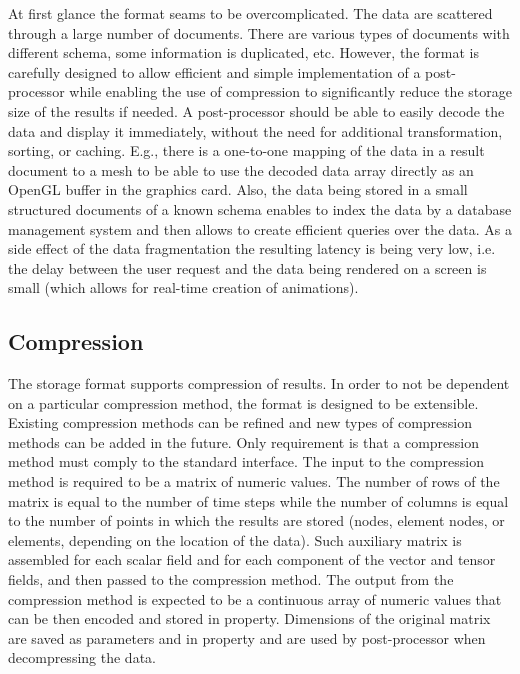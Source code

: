 At first glance the format seams to be overcomplicated. The data are scattered through a large number of documents. There are various types of documents with different schema, some information is duplicated, etc. However, the format is carefully designed to allow efficient and simple implementation of a post-processor while enabling the use of compression to significantly reduce the storage size of the results if needed. A post-processor should be able to easily decode the data and display it immediately, without the need for additional transformation, sorting, or caching. E.g., there is a one-to-one mapping of the data in a result document to a mesh to be able to use the decoded data array directly as an OpenGL buffer in the graphics card. Also, the data being stored in a small structured documents of a known schema enables to index the data by a database management system and then allows to create efficient queries over the data. As a side effect of the data fragmentation the resulting latency is being very low, i.e. the delay between the user request and the data being rendered on a screen is small (which allows for real-time creation of animations).


\subsection {Compression}
\label{subsec:compression}

The storage format supports compression of results. In order to not be dependent on a particular compression method, the format is designed to be extensible. Existing compression methods can be refined and new types of compression methods can be added in the future. Only requirement is that a compression method must comply to the standard interface. The input to the compression method is required to be a matrix of numeric values. The number of rows of the matrix is equal to the number of time steps while the number of columns is equal to the number of points in which the results are stored (nodes, element nodes, or elements, depending on the location of the data). Such auxiliary matrix is assembled for each scalar field and for each component of the vector and tensor fields, and then passed to the compression method. The output from the compression method is expected to be a continuous array of numeric values that can be then encoded and stored in  property. Dimensions of the original matrix are saved as parameters  and  in  property and are used by post-processor when decompressing the data.

